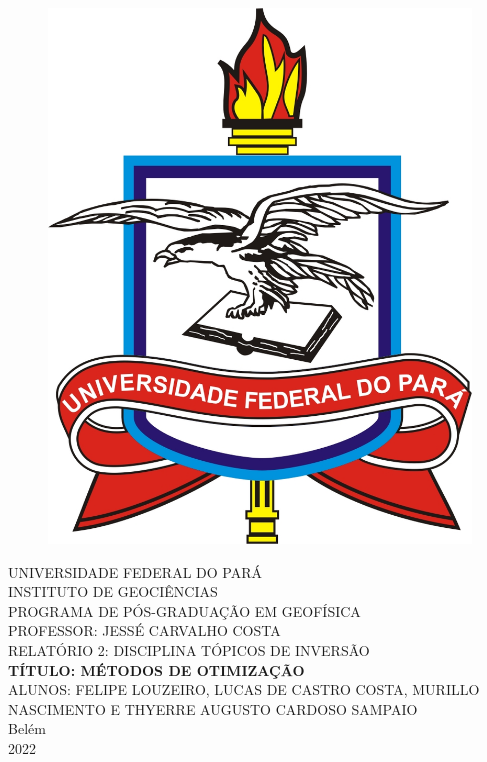 \documentclass[12pt]{article}
\begin{document}
\thispagestyle{empty}

 \begin{figure}[!t]
 
  \begin{center}
   \includegraphics[scale=0.8]{Logo_UFPA.jpg}
  \end{center}

 \end{figure}

 \begin{center}
  \large{UNIVERSIDADE FEDERAL DO PARÁ} \\ {INSTITUTO DE GEOCIÊNCIAS} \\ {PROGRAMA DE PÓS-GRADUAÇÃO EM GEOFÍSICA} \\
  \vspace{2cm}
  \large{PROFESSOR: JESSÉ CARVALHO COSTA} \\
  \vspace{2cm}
  \large{RELATÓRIO 2: DISCIPLINA TÓPICOS DE INVERSÃO} \\
  \vspace{2cm}
  \large {\bf {TÍTULO: MÉTODOS DE OTIMIZAÇÃO}} \\
  \vspace{2cm}
  \large {ALUNOS: FELIPE  LOUZEIRO, LUCAS DE CASTRO COSTA, MURILLO NASCIMENTO E THYERRE AUGUSTO CARDOSO SAMPAIO} \\
  \vfill 
  \large Belém \\ 2022
 \end{center}
\end{document}
